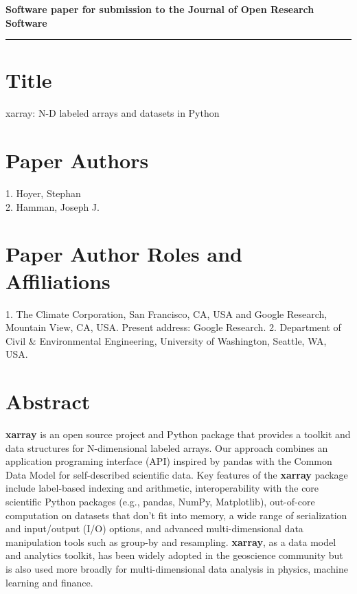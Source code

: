 \documentclass{jors}
\begin{document}
{\bf Software paper for submission to the Journal of Open Research Software} \\



\rule{\textwidth}{1pt}

\vspace{0.5cm}

\section*{Title}

xarray: N-D labeled arrays and datasets in Python

\section*{Paper Authors}

{1. Hoyer, Stephan \\
 2. Hamman, Joseph J.}

\section*{Paper Author Roles and Affiliations}
{1. The Climate Corporation, San Francisco, CA, USA and Google Research, Mountain View, CA, USA. Present address: Google Research. 2. Department of Civil \& Environmental Engineering, University of Washington, Seattle, WA, USA.}

\section*{Abstract}

\textbf{xarray} is an open source project and Python package that provides a toolkit and data structures for N-dimensional labeled arrays.
Our approach combines an application programing interface (API) inspired by pandas with the Common Data Model for self-described scientific data.
Key features of the \textbf{xarray} package include label-based indexing and arithmetic, interoperability with the core scientific Python packages (e.g., pandas, NumPy, Matplotlib), out-of-core computation on datasets that don't fit into memory, a wide range of serialization and input/output (I/O) options, and advanced multi-dimensional data manipulation tools such as group-by and resampling.
\textbf{xarray}, as a data model and analytics toolkit, has been widely adopted in the geoscience community but is also used more broadly for multi-dimensional data analysis in physics, machine learning and finance.
\end{document}
